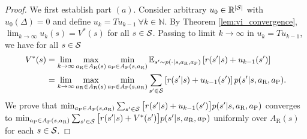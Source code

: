 \documentclass[11pt]{article}
\newcommand{\abs}[1]{\left\lvert#1\right\rvert}
\begin{document}
       \begin{proof}
           We first establish part $(a)$. Consider arbitrary $u_0 \in \mathbb{R}^{\abs{\cal S}}$ with $u_0(\Delta) = 0$ and define $u_{k} = Tu_{k-1} \ \forall k \in \mathbb{N}$. By Theorem \ref{lem:vi_convergence}, $\lim_{k \to \infty}u_k(s) = V^*(s)$ for all $s \in {\cal S}$. Passing to limit $k \to \infty$ in $u_k = Tu_{k-1}$,  we have for all $s \in {\cal S}$ 
           \begingroup
           \allowdisplaybreaks
           \begin{align}
           \nonumber
           V^*(s) &= \lim_{k\to\infty}\max_{a_\text{R} \in A_\text{R}(s)}\min_{a_\text{P} \in A_\text{P}(s,a_\text{R})}\mathbb{E}_{s' \sim p(\cdot|s,a_\text{R},a_\text{P})}\left[r(s'|s) + u_{k-1}(s')\right]\\
           \label{eqn:bellman_equation_temp1}
           &= \lim_{k \to \infty}\max_{a_\text{R} \in A_\text{R}(s)}\min_{a_\text{P} \in A_\text{P}(s,a_\text{R})}\sum_{s' \in {\cal S}}\left[r(s'|s) + u_{k-1}(s')\right]p(s'|s,a_\text{R},a_\text{P}).
           \end{align}
           \endgroup
           We prove that $\min_{a_\text{P} \in A_\text{P}(s,a_\text{R})}\sum_{s' \in {\cal S}}\big[r(s'|s) + u_{k-1}(s')\big]p(s'|s,a_\text{R},a_\text{P})$ converges to $\min_{a_\text{P} \in A_\text{P}(s,a_\text{R})}\sum_{s' \in {\cal S}}\big[\\r(s'|s) + V^*(s')\big]p(s'|s,a_\text{R},a_\text{P})$ uniformly over $A_\text{R}(s)$ for each $s \in {\cal S}$.
           

\end{proof}
\end{document}
